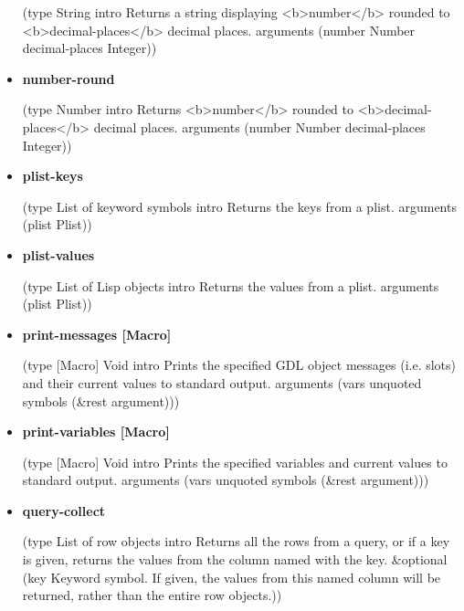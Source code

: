 \documentclass [11pt]{book}
\begin{document}
\begin{itemize}
(type String intro
  Returns a string displaying <b>number</b> rounded to <b>decimal-places</b> decimal places.
 arguments (number Number decimal-places Integer))



\item {}
\label{prim:number-round}
\textbf{number-round}

(type Number intro
  Returns <b>number</b> rounded to <b>decimal-places</b> decimal places.
 arguments (number Number decimal-places Integer))



\item {}
\label{prim:plist-keys}
\textbf{plist-keys}

(type List of keyword symbols intro  Returns the keys from a plist.
 arguments (plist Plist))



\item {}
\label{prim:plist-values}
\textbf{plist-values}

(type List of Lisp objects intro  Returns the values from a plist.
 arguments (plist Plist))



\item {}
\label{prim:print-messages}
\textbf{print-messages [Macro]}

(type [Macro] Void intro
  Prints the specified GDL object messages (i.e. slots) and their current values to standard output.
 arguments (vars unquoted symbols (\&rest argument)))



\item {}
\label{prim:print-variables}
\textbf{print-variables [Macro]}

(type [Macro] Void intro
  Prints the specified variables and current values to standard output.
 arguments (vars unquoted symbols (\&rest argument)))



\item {}
\label{prim:query-collect}
\textbf{query-collect}

(type List of row objects intro
  Returns all the rows from a query, or if a key is given, returns the values from the column named with the key.
 \&optional
 (key
  Keyword symbol. If given, the values from this named column will be returned, rather than the entire row objects.))




\end{itemize}
\end{document}
